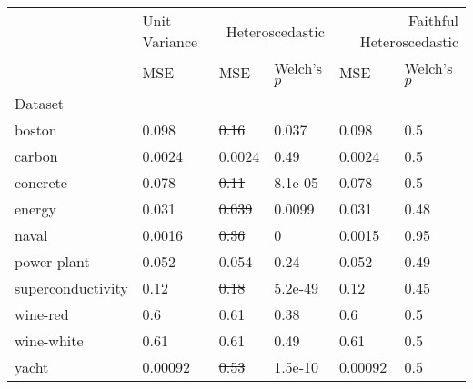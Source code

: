 \begin{tabular}{l|l|ll|ll}
\toprule
 & Unit Variance & \multicolumn{2}{r}{Heteroscedastic} & \multicolumn{2}{r}{Faithful Heteroscedastic} \\
 & MSE & MSE & Welch's $p$ & MSE & Welch's $p$ \\
Dataset &  &  &  &  &  \\
\midrule
boston & 0.098 & \sout{0.16} & 0.037 & 0.098 & 0.5 \\
carbon & 0.0024 & 0.0024 & 0.49 & 0.0024 & 0.5 \\
concrete & 0.078 & \sout{0.11} & 8.1e-05 & 0.078 & 0.5 \\
energy & 0.031 & \sout{0.039} & 0.0099 & 0.031 & 0.48 \\
naval & 0.0016 & \sout{0.36} & 0 & 0.0015 & 0.95 \\
power plant & 0.052 & 0.054 & 0.24 & 0.052 & 0.49 \\
superconductivity & 0.12 & \sout{0.18} & 5.2e-49 & 0.12 & 0.45 \\
wine-red & 0.6 & 0.61 & 0.38 & 0.6 & 0.5 \\
wine-white & 0.61 & 0.61 & 0.49 & 0.61 & 0.5 \\
yacht & 0.00092 & \sout{0.53} & 1.5e-10 & 0.00092 & 0.5 \\
\bottomrule
\end{tabular}
